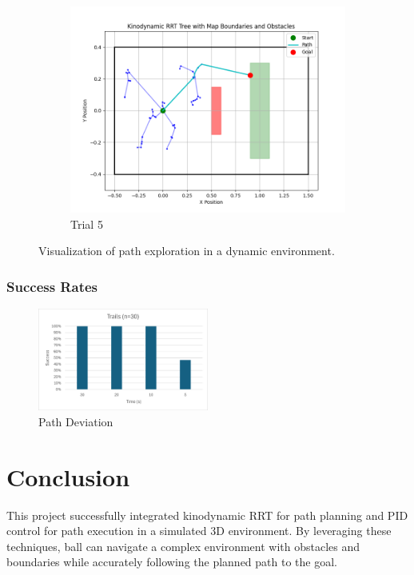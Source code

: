\documentclass[12pt]{article}
\begin{document}
\begin{figure}[h!]
    \begin{subfigure}{0.45\textwidth}
        \centering
        \includegraphics[width=\textwidth]{./images/tree5.png}
        \caption{Trial 5}
        \label{fig:tree_5}
    \end{subfigure}

    \caption{Visualization of path exploration in a dynamic environment.}
    \label{fig:trials}
\end{figure}


\subsubsection{Success Rates}
\begin{figure}[h!]
    \centering
    \includegraphics[width=0.5\textwidth]{./images/success.png}
    \caption{Path Deviation}
    \label{fig:Succees Rates}
\end{figure}

\section{Conclusion}
This project successfully integrated kinodynamic RRT for path planning and PID control for path execution in a simulated 3D environment. By leveraging these techniques, ball can navigate a complex environment with obstacles and boundaries while accurately following the planned path to the goal.
\end{document}

